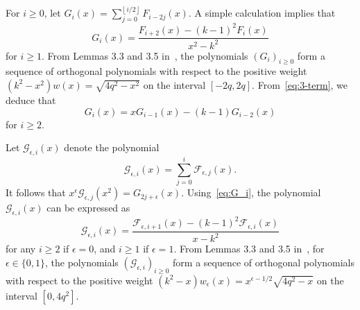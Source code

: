 \documentclass[ALCO,ThmDefs,Unicode,epreuves]{cedram}
\providecommand{\floor}[1]{\left\lfloor#1\right\rfloor}
\begin{document}
For $i\geq 0$, let $G_i(x)=\sum_{j=0}^{\floor{i/2}}F_{i-2j}(x)$. A simple calculation implies that
\begin{equation} \label{eq:G_i}
{G}_{i}(x)=
\frac{{F}_{i+2}(x)-(k-1)^2 {F}_{i}(x) }{x^2-k^2}
\end{equation}
for $i\geq 1$.
From Lemmas 3.3 and 3.5 in~\cite{CK07}, the polynomials $(G_i)_{i\geq 0}$ form a sequence of 
orthogonal polynomials with respect to 
the positive weight $(k^2-x^2)w(x)=\sqrt{4q^2-x^2}$ on the interval $[-2q,2q]$. From~\eqref{eq:3-term}, we deduce that
\[
G_i(x)=xG_{i-1}(x)-(k-1)G_{i-2}(x)
\]
for $i\geq 2$. 

Let $\mathscr{G}_{\epsilon, i}(x)$ denote the 
polynomial 
\begin{equation} \label{eq:def_scrG}
\mathscr{G}_{\epsilon, i}(x)=\sum_{j=0}^i
\mathscr{F}_{\epsilon, j}(x). 
\end{equation} 
It follows that 
$x^{\epsilon} \mathscr{G}_{\epsilon, j}(x^2)=G_{2j+\epsilon}(x)$. Using~\eqref{eq:G_i}, the polynomial $\mathscr{G}_{\epsilon, i}(x)$ can be expressed as
\begin{equation} \label{eq:pro_scrG}
\mathscr{G}_{\epsilon, i}(x)=
\frac{\mathscr{F}_{\epsilon, i+1}(x)-(k-1)^2\mathscr{F}_{\epsilon, i}(x) }{x-k^2}
\end{equation}
for any $i\geq 2$ if $\epsilon=0$, and
$i\geq 1$ if $\epsilon=1$. 
From Lemmas 3.3 and 3.5 in~\cite{CK07}, 
for $\epsilon\in \{0,1\}$, the polynomials $(\mathscr{G}_{\epsilon,i})_{i\geq 0}$ form a sequence of orthogonal polynomials with respect to 
the positive weight $(k^2-x)w_{\epsilon}(x)=x^{\epsilon-1/2}\sqrt{4q^2-x}$ on the interval $[0,4q^2]$. 
\end{document}
